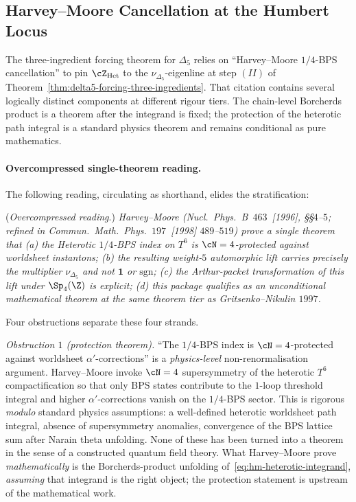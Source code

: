 
\subsection*{Harvey--Moore Cancellation at the Humbert Locus}
\label{subsec:harvey-moore-cancellation-humbert}

The three-ingredient forcing theorem for $\Delta_5$ relies on
``Harvey--Moore $1/4$-BPS cancellation'' to pin $\cZ_{\mathrm{Het}}$
to the $\nu_{\Delta_5}$-eigenline at step $(II)$ of
Theorem~\ref{thm:delta5-forcing-three-ingredients}. That citation
contains several logically distinct components at different rigour
tiers. The chain-level Borcherds product is a theorem after the
integrand is fixed; the protection of the heterotic path integral is a
standard physics theorem and remains conditional as pure mathematics.

\paragraph{Overcompressed single-theorem reading.}
The following reading, circulating as shorthand, elides the
stratification:
\begin{displayquote}
(\emph{Overcompressed reading}.) \emph{Harvey--Moore (\emph{Nucl.\ Phys.\ B}~$463$~[1996],
\S\S$4$--$5$; refined in \emph{Commun.\ Math.\ Phys.}~$197$~[1998]
$489$--$519$) prove a single theorem that \textup{(a)} the
Heterotic $1/4$-BPS index on $T^6$ is $\cN = 4$-protected against
worldsheet instantons; \textup{(b)} the resulting weight-$5$
automorphic lift carries precisely the multiplier $\nu_{\Delta_5}$
and not $\mathbf{1}$ or $\mathrm{sgn}$; \textup{(c)} the
Arthur-packet transformation of this lift under $\Sp_4(\Z)$ is
explicit; \textup{(d)} this package qualifies as an unconditional
mathematical theorem at the same theorem tier as Gritsenko--Nikulin
$1997$.}
\end{displayquote}
Four obstructions separate these four strands.

\emph{Obstruction $1$ (protection theorem).} ``The $1/4$-BPS index
is $\cN = 4$-protected against worldsheet $\alpha'$-corrections''
is a \emph{physics-level} non-renormalisation argument.
Harvey--Moore invoke $\cN = 4$ supersymmetry of the heterotic
$T^6$ compactification so that only BPS states contribute to the
$1$-loop threshold integral and higher $\alpha'$-corrections vanish
on the $1/4$-BPS sector. This is rigorous \emph{modulo} standard
physics assumptions: a well-defined heterotic worldsheet path
integral, absence of supersymmetry anomalies, convergence of the
BPS lattice sum after Narain theta unfolding. None of these has
been turned into a theorem in the sense of a constructed quantum
field theory. What Harvey--Moore prove \emph{mathematically} is
the Borcherds-product unfolding
of~\eqref{eq:hm-heterotic-integrand}, \emph{assuming} that
integrand is the right object; the protection statement is
upstream of the mathematical work.

